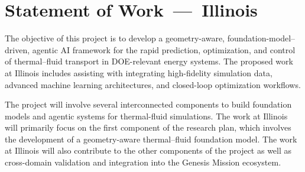 \documentclass[11pt]{article}
\begin{document}
\pagestyle{fancy}
\setcounter{page}{1}

\newpage

\section{Statement of Work~---~Illinois}
\medskip

The objective of this project is to develop a geometry-aware,
foundation-model–driven, agentic AI framework for the rapid prediction,
optimization, and control of thermal–fluid transport in DOE-relevant energy
systems. The proposed work at Illinois includes assisting with integrating
high-fidelity simulation data, advanced machine learning architectures, and
closed-loop optimization workflows.

The project will involve several interconnected components to build foundation
models and agentic systems for thermal-fluid simulations.  The work at Illinois
will primarily focus on the first component of the research plan, which
involves the development of a geometry-aware thermal–fluid foundation model.
The work at Illinois will also contribute to the other components of the
project as well as cross-domain validation and integration into the Genesis
Mission ecosystem.
\end{document}
